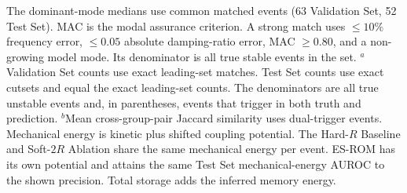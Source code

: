 {\begin{table}[!t]
\parbox{\textwidth}{\footnotesize
The dominant-mode medians use common matched events (63 Validation Set,
52 Test Set). MAC is the modal assurance criterion. A strong match uses
$\leq10\%$ frequency error, $\leq0.05$ absolute damping-ratio error,
MAC $\geq0.80$, and a non-growing model mode. Its denominator is
all true stable events in the set.
$^{a}$Validation Set counts use exact leading-set matches. Test Set
counts use exact cutsets and equal the exact leading-set counts.
The denominators are all true unstable events and, in parentheses,
events that trigger in both truth and prediction.
$^{b}$Mean cross-group-pair Jaccard similarity uses dual-trigger events.
Mechanical energy is kinetic plus shifted coupling potential.
The Hard-$R$ Baseline and Soft-$2R$ Ablation share the same mechanical
energy per event. ES-ROM has its own potential and attains the same
Test Set mechanical-energy AUROC to the shown precision. Total storage
adds the inferred memory energy.}
\end{table}%
}

